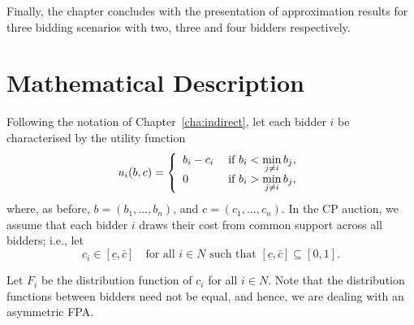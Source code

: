 Finally, the chapter concludes with the presentation of approximation results for three bidding scenarios with two, three and four bidders respectively.

\section{Mathematical Description} %
\label{sec:mathematical_description_approximation}

Following the notation of Chapter~\ref{cha:indirect}, let each bidder $i$ be characterised by the utility function
\begin{equation}
  \label{eq:utility_approximation}
    u_i(b,c) = \left\{
  \begin{array}{l l}
    b_i-c_i & \;\text{if } b_i < \displaystyle\min_{j\neq i}b_j,\\
    0 & \;\text{if } b_i > \displaystyle\min_{j\neq i}b_j,
  \end{array}\right.
\end{equation}
where, as before, $b = (b_1,\ldots,b_n)$, and $c = (c_1,\ldots,c_n)$. In the CP auction, we assume that each bidder $i$ draws their cost from common support across all bidders; i.e., let
\begin{equation*}
  c_i\in [\underline{c}, \bar{c}] \quad\text{for all } i\in N \text{ such that } [\underline{c}, \bar{c}]\subseteq [0, 1].
\end{equation*}

Let $F_i$ be the distribution function of $c_i$ for all $i\in N$. Note that the distribution functions between bidders need not be equal, and hence, we are dealing with an asymmetric FPA.

